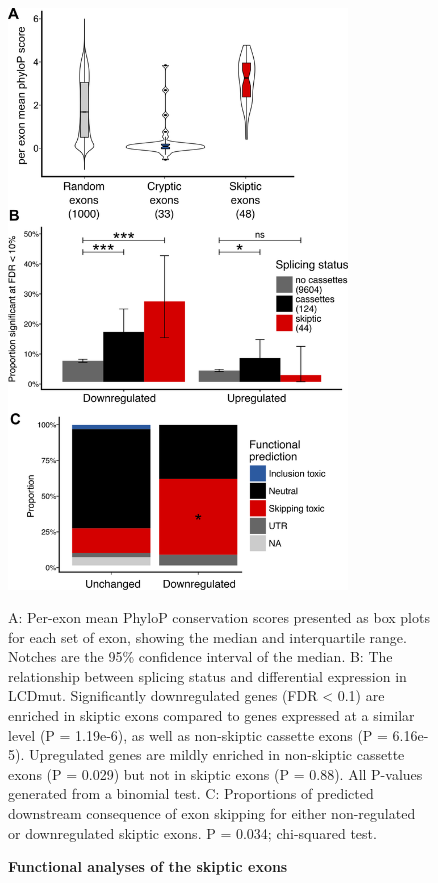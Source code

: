 \begin{figure}[h!]
	\centering
	\includegraphics[width=9cm]{Figures/05_tdp_mice/functional_plots_vertical.png}
	\caption{\textbf{Functional analyses of the skiptic exons}}
	A: Per-exon mean PhyloP conservation scores presented as box plots for each set of exon, showing the median and interquartile range. Notches are the 95\% confidence interval of the median. B: The relationship between splicing status and differential expression in LCDmut. Significantly downregulated genes (FDR < 0.1) are enriched in skiptic exons compared to genes expressed at a similar level (P = 1.19e-6), as well as non-skiptic cassette exons (P = 6.16e-5). Upregulated genes are mildly enriched in non-skiptic cassette exons (P = 0.029) but not in skiptic exons (P = 0.88). All P-values generated from a binomial test. C: Proportions of predicted downstream consequence of exon skipping for either non-regulated or downregulated skiptic exons. P = 0.034; chi-squared test.
	\label{fig:functional_plots}
\end{figure}


